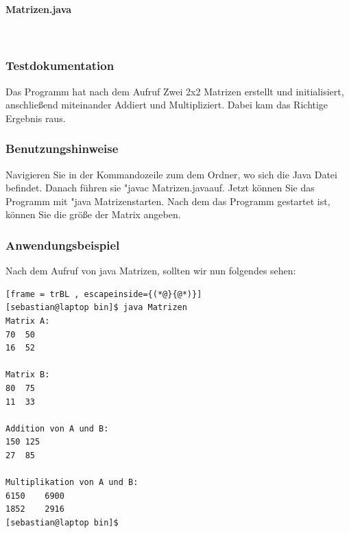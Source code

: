 \paragraph{Matrizen.java}\


\subsubsection{Testdokumentation}
Das Programm hat nach dem Aufruf Zwei 2x2 Matrizen erstellt und initialisiert, anschließend 
miteinander Addiert und Multipliziert. Dabei kam das Richtige Ergebnis raus.

\subsubsection{Benutzungshinweise}
Navigieren Sie in der Kommandozeile zum dem Ordner, wo sich die Java Datei befindet.
Danach führen sie "javac Matrizen.java\dq \space auf. Jetzt können Sie das Programm mit
"java Matrizen\dq \space starten. Nach dem das Programm gestartet ist, können Sie die
grö\ss e der Matrix angeben.

\subsubsection{Anwendungsbeispiel}
Nach dem Aufruf von java Matrizen, sollten wir nun folgendes sehen:
\begin{lstlisting}[frame = trBL , escapeinside={(*@}{@*)}]
[sebastian@laptop bin]$ java Matrizen
Matrix A:
70	50	
16	52	

Matrix B:
80	75	
11	33	

Addition von A und B:
150	125	
27	85	

Multiplikation von A und B:
6150	6900	
1852	2916
[sebastian@laptop bin]$  
\end{lstlisting}

